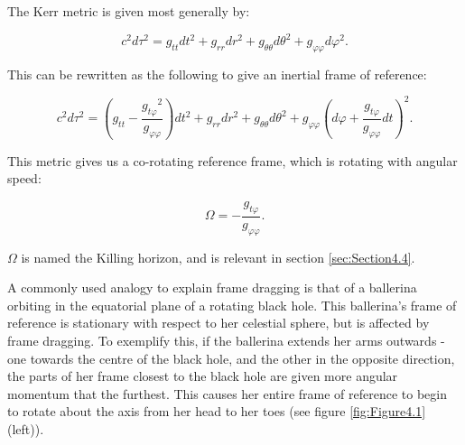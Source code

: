 \documentclass[oneside,openright,frontopenright, singlespacing]{dmathesis}
\begin{document}
\vspace{1em}
	The Kerr metric is given most generally by:

	\[c^2d\tau^2 = g_{tt}dt^2+g_{rr}dr^2+g_{\theta\theta}d\theta^2+g_{\varphi\varphi}d\varphi^2.\]

\vspace{1em}
	This can be rewritten as the following to give an inertial frame of reference:

	\[c^2d\tau^2 = \left(g_{tt}-\frac{{g_{t\varphi}}^2}{g_{\varphi\varphi}}\right)dt^2+g_{rr}dr^2+g_{\theta\theta}d\theta^2+g_{\varphi\varphi}\left(d\varphi+\frac{g_{t\varphi}}{g_{\varphi\varphi}}dt\right)^2.\]

\vspace{1em}
	This metric gives us a co-rotating reference frame, which is rotating with angular speed:

	\[\Omega = -\frac{g_{t\varphi}}{g_{\varphi\varphi}}.\]

\vspace{1em}
	$\Omega$ is named the Killing horizon, and is relevant in section \ref{sec:Section4.4}.

\vspace{1em}
	A commonly used analogy to explain frame dragging is that of a ballerina orbiting in the equatorial plane of a rotating black hole. This ballerina's frame of reference is stationary with respect to her celestial sphere, but is affected by frame dragging. To exemplify this, if the ballerina extends her arms outwards - one towards the centre of the black hole, and the other in the opposite direction, the parts of her frame closest to the black hole are given more angular momentum that the furthest. This causes her entire frame of reference to begin to rotate about the axis from her head to her toes (see figure \ref{fig:Figure4.1} (left)).
\end{document}
